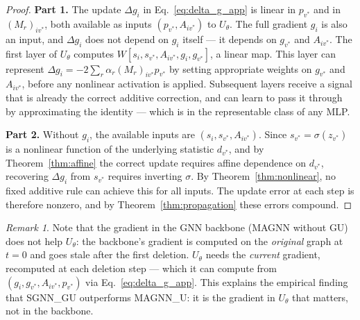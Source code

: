 \documentclass[11pt]{article}
\newcommand{\change}[1]{{\color{red}#1}}
\theoremstyle{plain}
\theoremstyle{definition}
\theoremstyle{remark}
\newtheorem{remark}[theorem]{Remark}
\begin{document}
\begin{proof}
  \change{
    \textbf{Part 1.} The update $\Delta g_i$ in Eq.~\eqref{eq:delta_g_app} is linear in
    $p_{v^*}$ and in $(M_r)_{iv^*}$, both available as inputs $(p_{v^*}, A_{iv^*})$ to
    $U_\theta$. The full gradient $g_i$ is also an input, and $\Delta g_i$ does not
    depend on $g_i$ itself --- it depends on $g_{v^*}$ and $A_{iv^*}$. The first layer
    of $U_\theta$ computes $W[s_i, s_{v^*}, A_{iv^*}, g_i, g_{v^*}]$, a linear map.
    This layer can represent $\Delta g_i = -2\sum_r \alpha_r (M_r)_{iv^*} p_{v^*}$ by
    setting appropriate weights on $g_{v^*}$ and $A_{iv^*}$, before any nonlinear
    activation is applied. Subsequent layers receive a signal that is already the correct
    additive correction, and can learn to pass it through by approximating the identity
    --- which is in the representable class of any MLP.

    \textbf{Part 2.} Without $g_i$, the available inputs are $(s_i, s_{v^*}, A_{iv^*})$.
    Since $s_{v^*} = \sigma(z_{v^*})$ is a nonlinear function of the underlying statistic
    $d_{v^*}$, and by Theorem~\ref{thm:affine} the correct update requires affine
    dependence on $d_{v^*}$, recovering $\Delta g_i$ from $s_{v^*}$ requires inverting
    $\sigma$. By Theorem~\ref{thm:nonlinear}, no fixed additive rule can achieve this
    for all inputs. The update error at each step is therefore nonzero, and by
  Theorem~\ref{thm:propagation} these errors compound.}
\end{proof}

\begin{remark}
  \change{Note that the gradient in the GNN backbone (MAGNN without GU) does not help
    $U_\theta$: the backbone's gradient is computed on the \emph{original} graph at $t=0$
    and goes stale after the first deletion. $U_\theta$ needs the \emph{current}
    gradient, recomputed at each deletion step --- which it can compute from $(g_i,
    g_{v^*}, A_{iv^*}, p_{v^*})$ via Eq.~\eqref{eq:delta_g_app}. This explains the
    empirical finding that SGNN\_GU outperforms MAGNN\_U: it is the gradient in $U_\theta$
  that matters, not in the backbone.}
\end{remark}
\end{document}

